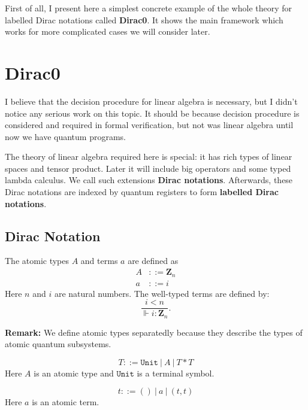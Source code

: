   
% 

First of all, I present here a simplest concrete example of the whole theory for labelled Dirac notations called \textbf{Dirac0}. It shows the main framework which works for more complicated cases we will consider later.

\section{Dirac0}

I believe that the decision procedure for linear algebra is necessary, but I didn't notice any serious work on this topic. It should be because decision procedure is considered and required in formal verification, but not was linear algebra until now we have quantum programs. 

The theory of linear algebra required here is special: it has rich types of linear spaces and tensor product. Later it will include big operators and some typed lambda calculus. We call such extensions \textbf{Dirac notations}. Afterwards, these Dirac notations are indexed by quantum registers to form \textbf{labelled Dirac notations}.

\subsection{Dirac Notation}

\begin{definition}
  The atomic types $A$ and terms $a$ are defined as
  \begin{align*}
    A & ::= \mathbf{Z}_n \\
    a & ::= i
  \end{align*}
  Here $n$ and $i$ are natural numbers. The well-typed terms are defined by:
  $$
  \frac{i < n}{\Vdash i : \mathbf{Z}_n}.
  $$
\end{definition}
\textbf{Remark:} We define atomic types separatedly because they describe the types of atomic quantum subsystems.

\begin{definition} 
  $$
  T ::= \texttt{Unit}\ |\ A\ |\ T * T
  $$
  Here $A$ is an atomic type and $\texttt{Unit}$ is a terminal symbol.
\end{definition}

\begin{definition}
  $$
  t ::= ()\ |\ a\ |\ (t, t)
  $$
  Here $a$ is an atomic term.
\end{definition}


